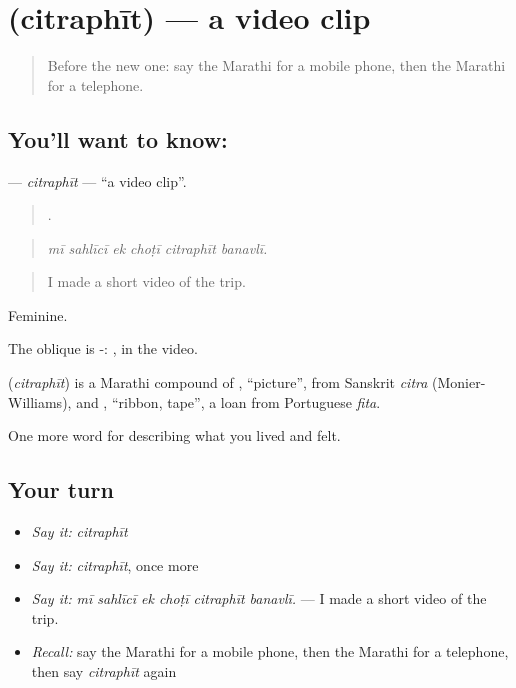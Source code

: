 \section[\texorpdfstring{\mr{चित्रफीत} (citraphīt)}{चित्रफीत (citraphīt)}]{ (citraphīt) — a video clip}

\label{lesson:MR-C516-citraphit}



\begin{quote}
Before the new one: say the Marathi for a mobile phone, then the Marathi for a telephone.
\end{quote}

\subsection*{You'll want to know: }
\textbf{} — \emph{citraphīt} — \textquotedblleft{}a video clip\textquotedblright{}.

\begin{quote}
     .
\end{quote}

\begin{quote}
\emph{mī sahlīcī ek choṭī citraphīt banavlī.}
\end{quote}

\begin{quote}
I made a short video of the trip.
\end{quote}

Feminine.

The oblique is -: , in the video.

\begin{cousinweb}
\textbf{} (\emph{citraphīt}) is a Marathi compound of , \textquotedblleft{}picture\textquotedblright{}, from Sanskrit \emph{citra} (Monier-Williams), and , \textquotedblleft{}ribbon, tape\textquotedblright{}, a loan from Portuguese \emph{fita}.
\end{cousinweb}

\begin{grammarlens}[title={What you've built}]
One more word for describing what you lived and felt.
\end{grammarlens}

\subsection*{Your turn}
\begin{itemize}
\raggedright
  \item \emph{Say it:} \emph{citraphīt}
  \item \emph{Say it:} \emph{citraphīt}, once more
  \item \emph{Say it:} \emph{mī sahlīcī ek choṭī citraphīt banavlī.} — I made a short video of the trip.
  \item \emph{Recall:} say the Marathi for a mobile phone, then the Marathi for a telephone, then say \emph{citraphīt} again
\end{itemize}

